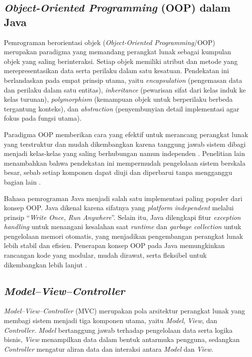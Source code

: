 \subsection{\textit{Object-Oriented Programming} (OOP) dalam Java} \label{II.OOPJava}
Pemrograman berorientasi objek (\textit{Object-Oriented Programming}/OOP) merupakan paradigma yang memandang perangkat lunak sebagai kumpulan objek yang saling berinteraksi. Setiap objek memiliki atribut dan metode yang merepresentasikan data serta perilaku dalam satu kesatuan. Pendekatan ini berlandaskan pada empat prinsip utama, yaitu \textit{encapsulation} (pengemasan data dan perilaku dalam satu entitas), \textit{inheritance} (pewarisan sifat dari kelas induk ke kelas turunan), \textit{polymorphism} (kemampuan objek untuk berperilaku berbeda tergantung konteks), dan \textit{abstraction} (penyembunyian detail implementasi agar fokus pada fungsi utama).\par

Paradigma OOP memberikan cara yang efektif untuk merancang perangkat lunak yang terstruktur dan mudah dikembangkan karena tanggung jawab sistem dibagi menjadi kelas-kelas yang saling berhubungan namun independen \cite{parmar2024survey}. Penelitian lain menambahkan bahwa pendekatan ini mempermudah pengelolaan sistem berskala besar, sebab setiap komponen dapat diuji dan diperbarui tanpa mengganggu bagian lain \cite{nagineni2021research}.\par

Bahasa pemrograman Java menjadi salah satu implementasi paling populer dari konsep OOP. Java dikenal karena sifatnya yang \textit{platform independent} melalui prinsip ``\textit{Write Once, Run Anywhere}''. Selain itu, Java dilengkapi fitur \textit{exception handling} untuk menangani kesalahan saat \textit{runtime} dan \textit{garbage collection} untuk pengelolaan memori otomatis, yang menjadikan pengembangan perangkat lunak lebih stabil dan efisien. Penerapan konsep OOP pada Java memungkinkan rancangan kode yang modular, mudah dirawat, serta fleksibel untuk dikembangkan lebih lanjut \cite{fadillah2023features}.\par

\subsection{\textit{Model--View--Controller}} \label{II.MVC}
\textit{Model--View--Controller} (MVC) merupakan pola arsitektur perangkat lunak yang membagi sistem menjadi tiga komponen utama, yaitu \textit{Model}, \textit{View}, dan \textit{Controller}. \textit{Model} bertanggung jawab terhadap pengelolaan data serta logika bisnis, \textit{View} menampilkan data dalam bentuk antarmuka pengguna, sedangkan \textit{Controller} mengatur aliran data dan interaksi antara \textit{Model} dan \textit{View}.\par


